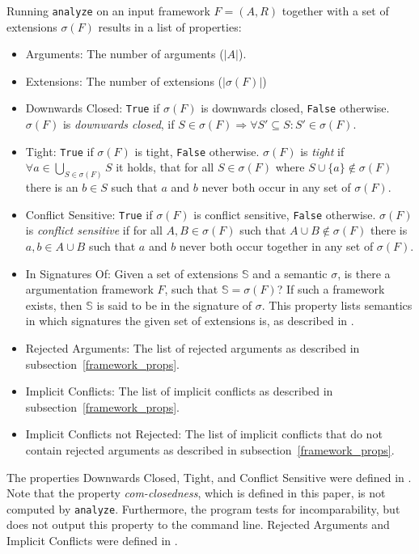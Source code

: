 \documentclass[parskip=half]{scrartcl}
\begin{document}
Running \texttt{analyze} on an input framework $F=(A,R)$ together with a set of
extensions $\sigma(F)$ results in a list of properties:
\begin{itemize}
  \item Arguments: The number of arguments ($|A|$).
  \item Extensions:	The number of extensions ($|\sigma(F)|$)
  \item Downwards Closed:	\texttt{True} if $\sigma(F)$ is downwards closed,
      \texttt{False} otherwise.  $\sigma(F)$ is \emph{downwards closed}, if $S
      \in \sigma(F)\Rightarrow \forall S'\subseteq S: S'\in\sigma(F)$.
  \item Tight: \texttt{True} if $\sigma(F)$ is tight, \texttt{False}
      otherwise.  $\sigma(F)$ is \emph{tight} if $\forall
      a\in\bigcup_{S\in\sigma(F)}S$ it holds, that for all $S\in\sigma(F)$ where
      $S\cup\{a\}\notin\sigma(F)$ there is an $b\in S$ such that $a$ and $b$
      never both occur in any set of $\sigma(F)$.
  \item Conflict Sensitive: \texttt{True} if $\sigma(F)$ is conflict sensitive,
      \texttt{False} otherwise.  $\sigma(F)$ is \emph{conflict sensitive} if for
      all $A, B\in\sigma(F)$ such that $A\cup B\notin\sigma(F)$ there is $a,
      b\in A\cup B$ such that $a$ and $b$ never both occur together in any set of
      $\sigma(F)$.
  \item In Signatures Of: Given a set of extensions $\mathbb{S}$ and a semantic
      $\sigma$, is there a argumentation framework $F$, such that $\mathbb{S} =
      \sigma(F)$? If such a framework exists, then $\mathbb{S}$ is said to be in
      the signature of $\sigma$. This property lists semantics in which
      signatures the given set of extensions is, as described in
      \cite{dunne2015characteristics}.
  \item Rejected Arguments: The list of rejected arguments as described in
      subsection~\ref{framework_props}.
  \item Implicit Conflicts: The list of implicit conflicts as described in
      subsection~\ref{framework_props}.
  \item Implicit Conflicts not Rejected: The list of implicit conflicts that do
      not contain rejected arguments as described in
      subsection~\ref{framework_props}.
\end{itemize}

The properties Downwards Closed, Tight, and Conflict Sensitive were defined in
\cite{dunne2015characteristics}. Note that the property \emph{com-closedness},
which is defined in this paper, is not computed by \texttt{analyze}. Furthermore,
the program tests for incomparability, but does not output this property to the
command line.  Rejected Arguments and Implicit Conflicts were defined in
\cite{baumann2016}.
\end{document}
